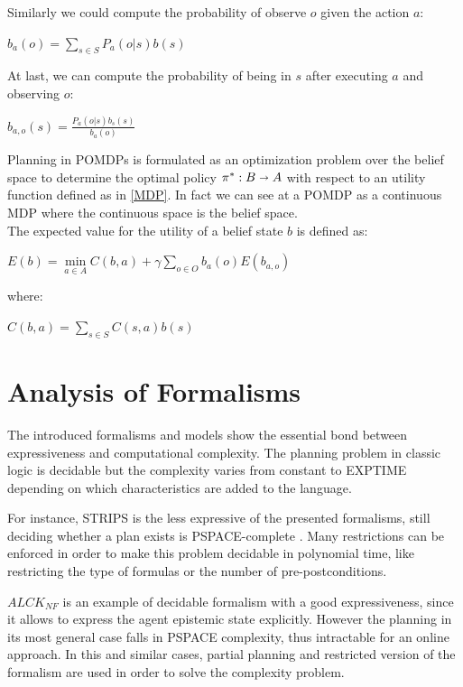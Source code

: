 \documentclass[pdftex,12pt,a4paper]{report}
\begin{document}
\noindent Similarly we could compute the probability of observe $o$ given the action $a$:
\begin{center}
\noindent $b_a(o) = \sum\limits_{s \in S} P_a(o|s)b(s)$ 
\end{center}

\noindent At last, we can compute the probability of being in $s$ after executing $a$ and observing $o$:
\begin{center}
\noindent $b_{a,o}(s) = \frac{P_a(o|s)b_s(s)}{b_a(o)}$ 
\end{center}

\noindent Planning in POMDPs is formulated as an optimization problem over the belief space to determine the optimal policy $\pi^* : B \shortrightarrow A$ with respect to an utility function defined as in \ref{MDP}. In fact we can see at a POMDP as a continuous MDP where the continuous space is the belief space.
\\\noindent The expected value for the utility of a belief state $b$ is defined as:
\begin{center}
\noindent $E(b) = \min\limits_{a \in A} C(b,a) + \gamma \sum\limits_{o \in O}b_a(o)E(b_{a,o})$ 
\end{center}
\noindent where:
\begin{center}
\noindent $C(b,a) = \sum\limits_{s \in S}C(s,a)b(s)$ 
\end{center}

\section{Analysis of Formalisms}\label{analysis}
The introduced formalisms and models show the essential bond between expressiveness and computational complexity. The planning problem in classic logic is decidable but the complexity varies from constant to EXPTIME depending on which characteristics are added to the language. 
\newline

\noindent For instance, STRIPS is the less expressive of the presented formalisms, still deciding whether a plan exists is PSPACE-complete \cite{bylander1994computational}.%
Many restrictions can be enforced in order to make this problem decidable in polynomial time, like restricting the type of formulas or the number of pre-postconditions. 
\newline

\noindent $ALCK_{NF}$ is an example of decidable formalism with a good expressiveness, since it allows to express the agent epistemic state explicitly. However the planning in its most general case falls in PSPACE complexity, thus intractable for an online approach. In this and similar cases, partial planning and restricted version of the formalism are used in order to solve the complexity problem.
\newline
\end{document}
